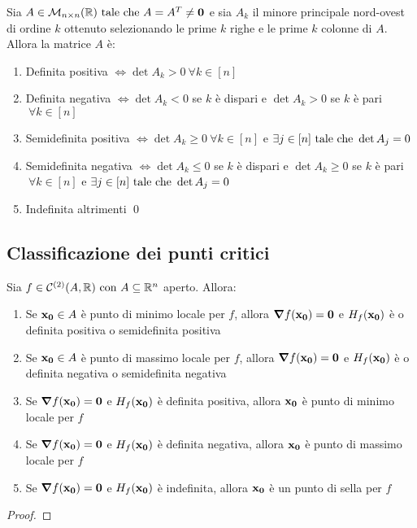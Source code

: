 \begin{theorem}
    Sia $A \in \mathcal{M}_{n\times n}(\mathbb{R}) \text{ tale che } A=A^T\neq \vb{0}$ e sia $A_k$ il minore principale nord-ovest di ordine $k$ ottenuto selezionando le prime $k$ righe e le prime $k$ colonne di $A$. Allora la matrice $A$ è:
    \begin{enumerate}
        \item Definita positiva $\iff \det A_k > 0 \ \forall k \in [n]$
        \item Definita negativa $\iff \det A_k < 0$ se $k$ è dispari e $\det A_k > 0$ se $k$ è pari $ \ \forall k \in [n]$
        \item Semidefinita positiva $\iff \det A_k \geq 0 \ \forall k \in [n]$ e $\exists j \in [n] \text{ tale che } \det A_j = 0$
        \item Semidefinita negativa $\iff \det A_k \leq 0$ se $k$ è dispari e $\det A_k \geq 0$ se $k$ è pari $ \ \forall k \in [n]$ e $\exists j \in [n] \text{ tale che } \det A_j=0$
        \item Indefinita altrimenti
        \qed
    \end{enumerate}
\end{theorem}

\subsection{Classificazione dei punti critici}

\begin{theorem}
    Sia $f \in \mathcal{C}^{(2)}(A, \mathbb{R}) \text{ con } A\subseteq \mathbb{R}^n$ aperto. Allora:
    \begin{enumerate}
        \item Se $\vb{x_0} \in A$ è punto di minimo locale per $f$, allora $\grad f(\vb{x_0})=\vb{0}$ e $H_f(\vb{x_0})$ è o definita positiva o semidefinita positiva
        \item Se $\vb{x_0} \in A$ è punto di massimo locale per $f$, allora $\grad f(\vb{x_0})=\vb{0}$ e $H_f(\vb{x_0})$ è o definita negativa o semidefinita negativa
        \item Se $\grad f(\vb{x_0})=\vb{0}$ e $H_f(\vb{x_0})$ è definita positiva, allora $\vb{x_0}$ è punto di minimo locale per $f$
        \item Se $\grad f(\vb{x_0})=\vb{0}$ e $H_f(\vb{x_0})$ è definita negativa, allora $\vb{x_0}$ è punto di massimo locale per $f$
        \item Se $\grad f(\vb{x_0})=\vb{0}$ e $H_f(\vb{x_0})$ è indefinita, allora $\vb{x_0}$ è un punto di sella per $f$
    \end{enumerate}
\end{theorem}

\begin{proof}
\end{proof}